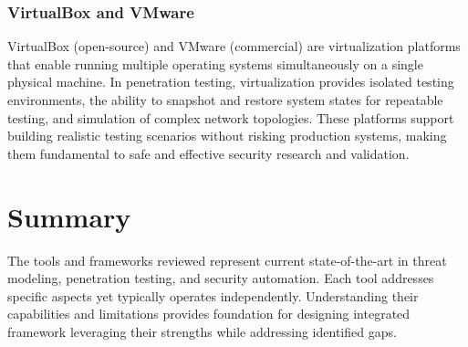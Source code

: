 \subsubsection{VirtualBox and VMware}
VirtualBox (open-source) and VMware (commercial) are virtualization platforms that enable running multiple operating systems simultaneously on a single physical machine. In penetration testing, virtualization provides isolated testing environments, the ability to snapshot and restore system states for repeatable testing, and simulation of complex network topologies. These platforms support building realistic testing scenarios without risking production systems, making them fundamental to safe and effective security research and validation.

\section{Summary}

The tools and frameworks reviewed represent current state-of-the-art in threat modeling, penetration testing, and security automation. Each tool addresses specific aspects yet typically operates independently. Understanding their capabilities and limitations provides foundation for designing integrated framework leveraging their strengths while addressing identified gaps.